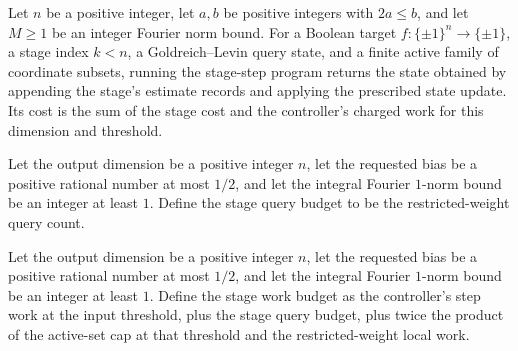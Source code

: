 \begin{theorem}
\label{FABL.DeterministicQueryProgram.runWithCost_deterministicGoldreichLevinStageStepProgram}
\leanok
{}
Let $n$ be a positive integer, let $a,b$ be positive integers with $2a\le b$, and let
$M\ge1$ be an integer Fourier norm bound. For a Boolean target
$f:\{\pm1\}^n\to\{\pm1\}$, a stage index $k<n$, a Goldreich–Levin query state, and a
finite active family of coordinate subsets, running the stage-step program returns the
state obtained by appending the stage’s estimate records and applying the prescribed
state update. Its cost is the sum of the stage cost and the controller’s charged work
for this dimension and threshold.
\end{theorem}

\begin{definition}
\label{FABL.deterministicGoldreichLevinStageQueryBudget}
\leanok
{}
Let the output dimension be a positive integer $n$, let the requested bias be a positive
rational number at most $1/2$, and let the integral Fourier $1$-norm bound be an integer
at least $1$. Define the stage query budget to be the restricted-weight query count.
\end{definition}

\begin{definition}
\label{FABL.deterministicGoldreichLevinStageWorkBudget}
\leanok
{}
Let the output dimension be a positive integer $n$, let the requested bias be a positive
rational number at most $1/2$, and let the integral Fourier $1$-norm bound be an integer
at least $1$. Define the stage work budget as the controller’s step work at the input
threshold, plus the stage query budget, plus twice the product of the active-set cap at
that threshold and the restricted-weight local work.
\end{definition}

